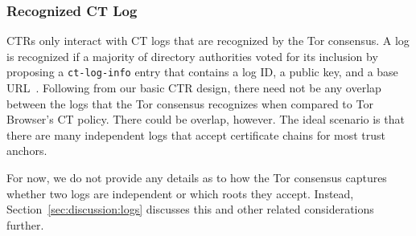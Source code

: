 
\subsubsection{Recognized CT Log} \label{sec:design-ca:consensus:log}
CTRs only interact with CT logs that are recognized by the Tor consensus.  A log
is recognized if a majority of directory authorities voted for its inclusion by
proposing a \texttt{ct-log-info} entry that contains a log ID, a public key, and
a base URL~\cite{ct,ct/bis}. 
Following from our basic CTR design, there need not be any overlap between the
logs that the Tor consensus recognizes when compared to Tor Browser's CT policy.
There could be overlap, however.  The ideal scenario is that there are many
independent logs that accept certificate chains for most trust anchors.

For now, we do not provide any details as to how the Tor consensus captures
whether two logs are independent or which roots they accept.  Instead,
Section~\ref{sec:discussion:logs} discusses this and other related
considerations further.

